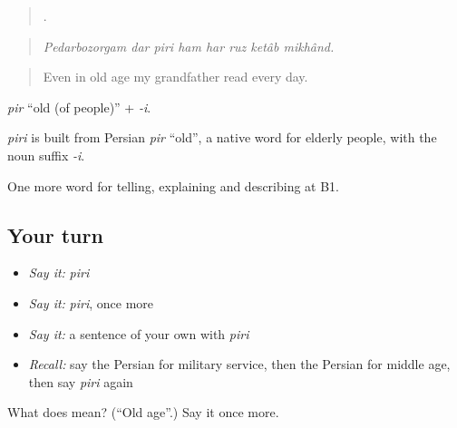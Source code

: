 \begin{quote}
       .
\end{quote}

\begin{quote}
\emph{Pedarbozorgam dar piri ham har ruz ketâb mikhând.}
\end{quote}

\begin{quote}
Even in old age my grandfather read every day.
\end{quote}

\emph{pir} \textquotedblleft{}old (of people)\textquotedblright{} + \emph{-i}.

\begin{cousinweb}
\emph{piri} is built from Persian \emph{pir} \textquotedblleft{}old\textquotedblright{}, a native word for elderly people, with the noun suffix \emph{-i}.
\end{cousinweb}

\begin{grammarlens}[title={What you've built}]
One more word for telling, explaining and describing at B1.
\end{grammarlens}

\subsection*{Your turn}
\begin{itemize}
\raggedright
  \item \emph{Say it:} \emph{piri}
  \item \emph{Say it:} \emph{piri}, once more
  \item \emph{Say it:} a sentence of your own with \emph{piri}
  \item \emph{Recall:} say the Persian for military service, then the Persian for middle age, then say \emph{piri} again
\end{itemize}

\begin{tcolorbox}[breakable,colback=teal!4,colframe=teal!35!black,title={Before you move on}]
What does  mean? (\textquotedblleft{}Old age\textquotedblright{}.) Say it once more.
\end{tcolorbox}
